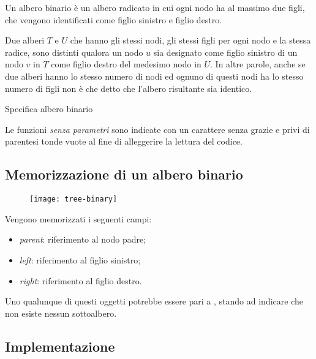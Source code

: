 \begin{definition}
Un albero binario è un albero radicato in cui ogni nodo ha al massimo due figli, che vengono identificati come figlio sinistro e figlio destro.
\end{definition}

\begin{note}
Due alberi \(T\) e \(U\) che hanno gli stessi nodi, gli stessi figli per ogni nodo e la stessa radice, sono distinti qualora un nodo \(u\) sia designato come figlio sinistro di un nodo \(v\) in \(T\) come figlio destro del medesimo nodo in \(U\).
In altre parole, anche se due alberi hanno lo stesso numero di nodi ed ognuno di questi nodi ha lo stesso numero di figli non è che detto che l'albero risultante sia identico.
\end{note}

\begin{algorithm}[H]
\caption*{Specifica albero binario}

\end{algorithm}

\begin{note}
Le funzioni \emph{senza parametri} sono indicate con un carattere senza grazie e privi di parentesi tonde vuote al fine di alleggerire la lettura del codice.
\end{note}

\subsection{Memorizzazione di un albero binario}

\begin{figure}[H]
	\centering
	\texttt{[image: tree-binary]}
\end{figure}

Vengono memorizzati i seguenti campi:
\begin{itemize}
	\item \emph{parent}: riferimento al nodo padre;
	\item \emph{left}: riferimento al figlio sinistro;
	\item \emph{right}: riferimento al figlio destro.
\end{itemize}
Uno qualunque di questi oggetti potrebbe essere pari a \Nil, stando ad indicare che non esiste nessun sottoalbero.

\subsection{Implementazione}

